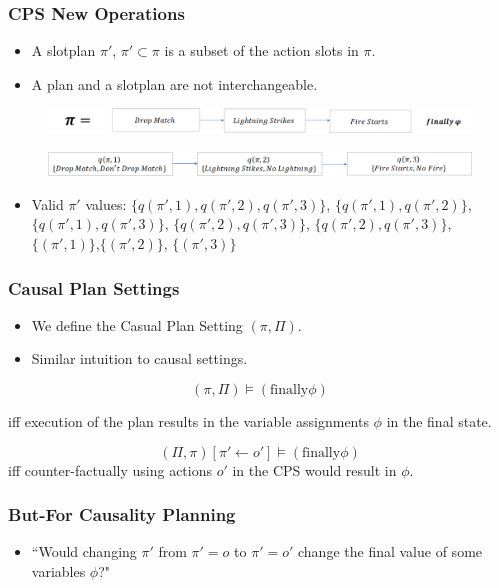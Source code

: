 \documentclass{beamer}
\theoremstyle{plain}
\theoremstyle{definition}
\begin{document}
\begin{frame}
\frametitle{CPS New Operations}
\begin{itemize}
\item A slotplan $\pi'$, $\pi'\subset \pi$ is a subset of the action slots in $\pi$.
\item A plan and a slotplan are not interchangeable.
\end{itemize}

\begin{figure}
\includegraphics[scale=.30]{bobPlanOriginal}
\end{figure}
\begin{figure}
\includegraphics[scale=.35]{bobPlan}
\end{figure}

\begin{itemize}
\item Valid $\pi'$ values: $\{q(\pi',1),q(\pi',2),q(\pi',3)\}$, $\{q(\pi',1),q(\pi',2)\}$, $\{q(\pi',1),q(\pi',3)\}$, $\{q(\pi',2),q(\pi',3)\}$, $\{q(\pi',2),q(\pi',3)\}$, $\{(\pi',1)\}$,$\{(\pi',2)\}$, $\{(\pi',3)\}$
\end{itemize}

\end{frame}

\begin{frame}
\frametitle{Causal Plan Settings}
\begin{itemize}
\item We define the Casual Plan Setting $(\pi, \Pi)$.
\item Similar intuition to causal settings.
\newline
\end{itemize}


\[
(\pi,\Pi)\models (\textrm{finally} \phi)
\]

iff execution of the plan results in the variable assignments $\phi$ in the final state.

\[
(\Pi, \pi)[\pi'\leftarrow o'] \models (\textrm{finally} \phi)
\]
iff counter-factually using actions $o'$ in the CPS would result in $\phi$.

\end{frame}




\begin{frame}
\frametitle{But-For Causality Planning}
\begin{itemize}
\item ``Would changing $\pi'$ from $\pi'=o$ to $\pi'= o'$ change the final value of some variables $\phi$?"
\end{itemize}

\end{frame}
\end{document}
